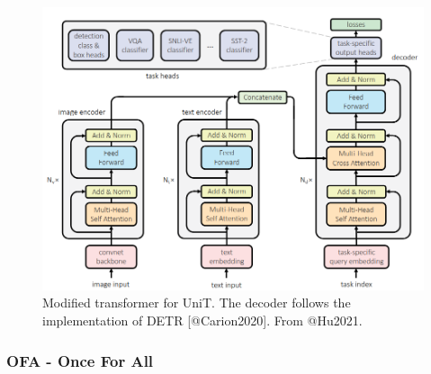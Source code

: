 \documentclass[
]{krantz}
\begin{document}
\begin{figure}

{\centering \includegraphics[width=0.8\linewidth]{figures/03-03-multipurpose/UniT} 

}

\caption{Modified transformer for UniT. The decoder follows the implementation of DETR [@Carion2020]. From @Hu2021.}\label{fig:unit}
\end{figure}

\hypertarget{ofa---once-for-all}{%
\subsubsection{OFA - Once For All}\label{ofa---once-for-all}}
\end{document}
